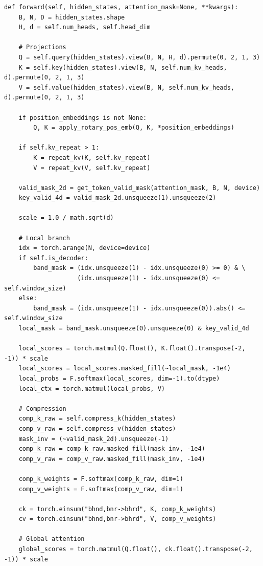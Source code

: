 \begin{lstlisting}
def forward(self, hidden_states, attention_mask=None, **kwargs):
    B, N, D = hidden_states.shape
    H, d = self.num_heads, self.head_dim
    
    # Projections
    Q = self.query(hidden_states).view(B, N, H, d).permute(0, 2, 1, 3)
    K = self.key(hidden_states).view(B, N, self.num_kv_heads, d).permute(0, 2, 1, 3)
    V = self.value(hidden_states).view(B, N, self.num_kv_heads, d).permute(0, 2, 1, 3)
    
    if position_embeddings is not None:
        Q, K = apply_rotary_pos_emb(Q, K, *position_embeddings)
    
    if self.kv_repeat > 1:
        K = repeat_kv(K, self.kv_repeat)
        V = repeat_kv(V, self.kv_repeat)
    
    valid_mask_2d = get_token_valid_mask(attention_mask, B, N, device)
    key_valid_4d = valid_mask_2d.unsqueeze(1).unsqueeze(2)
    
    scale = 1.0 / math.sqrt(d)
    
    # Local branch
    idx = torch.arange(N, device=device)
    if self.is_decoder:
        band_mask = (idx.unsqueeze(1) - idx.unsqueeze(0) >= 0) & \
                    (idx.unsqueeze(1) - idx.unsqueeze(0) <= self.window_size)
    else:
        band_mask = (idx.unsqueeze(1) - idx.unsqueeze(0)).abs() <= self.window_size
    local_mask = band_mask.unsqueeze(0).unsqueeze(0) & key_valid_4d
    
    local_scores = torch.matmul(Q.float(), K.float().transpose(-2, -1)) * scale
    local_scores = local_scores.masked_fill(~local_mask, -1e4)
    local_probs = F.softmax(local_scores, dim=-1).to(dtype)
    local_ctx = torch.matmul(local_probs, V)
    
    # Compression
    comp_k_raw = self.compress_k(hidden_states)
    comp_v_raw = self.compress_v(hidden_states)
    mask_inv = (~valid_mask_2d).unsqueeze(-1)
    comp_k_raw = comp_k_raw.masked_fill(mask_inv, -1e4)
    comp_v_raw = comp_v_raw.masked_fill(mask_inv, -1e4)
    
    comp_k_weights = F.softmax(comp_k_raw, dim=1)
    comp_v_weights = F.softmax(comp_v_raw, dim=1)
    
    ck = torch.einsum("bhnd,bnr->bhrd", K, comp_k_weights)
    cv = torch.einsum("bhnd,bnr->bhrd", V, comp_v_weights)
    
    # Global attention
    global_scores = torch.matmul(Q.float(), ck.float().transpose(-2, -1)) * scale
    

\end{lstlisting}
